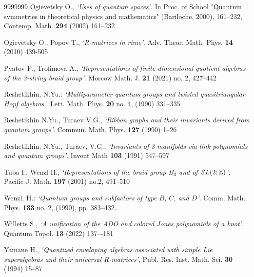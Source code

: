 \documentclass[11pt]{article}
\begin{document}
\begin{thebibliography}{9999999}
 Ogievetsky O., {\em `Uses of quantum spaces'}. In Proc. of School
"Quantum symmetries in theoretical physics and mathematics" (Bariloche, 2000),  161--232,
Contemp. Math. {\bf 294} (2002) 161--232

 Ogievetsky O., Popov T., {\em `R-matrices in rime'}. Adv. Theor. Math. Phys. {\bf 14} (2010) 439-505

 Pyatov P., Trofimova A., {\em `Representations of finite-dimensional quotient algebras of the 3-string braid group'}. Moscow Math. J.
{\bf 21} (2021) no. 2, 427--442
	
	
 Reshetikhin, N.Yu.: {\em `Multiparameter quantum groups and
	twisted quasitriangular Hopf algebras'}. Lett. Math. Phys. {\bf 20} no. 4, (1990)   331--335


  Reshetikhin N.Yu.,  Turaev V.G., {\em `Ribbon graphs and their invariants derived from quantum groups'}. Commun. Math. Phys. {\bf 127} (1990) 1--26

 Reshetikhin, N.Yu., Turaev, V.G., {\em `Invariants of 3-manifolds via link polynomials and quantum groups'}. Invent Math {\bf103} (1991) 547–597  %

 Tuba I.,  Wenzl H., {\em `Representations of the braid group $B_3$ and of $SL(2; {\Bbb Z})$'}, Pacific J.
Math. {\bf 197} (2001) no.2, 491--510 

 Wenzl, H.: {\em `Quantum groups and subfactors of type $B$, $C$, and $D$'}.
Comm. Math. Phys.  {\bf 133} no. 2, (1990),  pp. 383--432.

 Willetts S.,
{\em `A unification of the ADO and colored Jones polynomials of a knot'}.
Quantum Topol. {\bf 13} (2022) 137–-181

Yamane H., {\em `Quantized enveloping algebras associated with simple Lie superalgebras and their universal R-matrices'},
Publ. Res. Inst. Math. Sci. {\bf 30} (1994) 15--87
			
	
\end{thebibliography}
\end{document}
